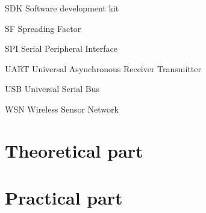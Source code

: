 \documentclass[oneside]{ctuthesis}
\theoremstyle{plain}
\theoremstyle{definition}
\theoremstyle{note}
\newcommand{\abbrlabel}[1]{\makebox[3cm][l]{\textbf{#1}\ \dotfill}}
\newenvironment{abbreviations}{\begin{list}{}{\renewcommand{\makelabel}{\abbrlabel}}}{\end{list}}
\begin{document}
\begin{abbreviations}
	\item[SDK]	 	Software development kit
	\item[SF]		Spreading Factor
	\item[SPI]   	Serial Peripheral Interface 
	\item[UART]		Universal Asynchronous Receiver Transmitter 
	\item[USB]		Universal Serial Bus 
	\item[WSN]		Wireless Sensor Network

\end{abbreviations}

\setcounter{secnumdepth}{1} %




\part{Theoretical part}
									



\part{Practical part}










\appendix


\end{document}

